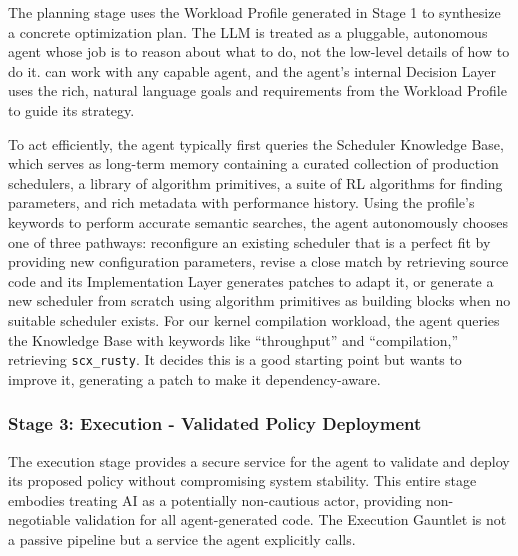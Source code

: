 The planning stage uses the Workload Profile generated in Stage 1 to synthesize a concrete optimization plan. The LLM is treated as a pluggable, autonomous agent whose job is to reason about what to do, not the low-level details of how to do it. \sys can work with any capable agent, and the agent's internal Decision Layer uses the rich, natural language goals and requirements from the Workload Profile to guide its strategy.

To act efficiently, the agent typically first queries the Scheduler Knowledge Base, which serves as long-term memory containing a curated collection of production schedulers, a library of algorithm primitives, a suite of RL algorithms for finding parameters, and rich metadata with performance history. Using the profile's keywords to perform accurate semantic searches, the agent autonomously chooses one of three pathways: reconfigure an existing scheduler that is a perfect fit by providing new configuration parameters, revise a close match by retrieving source code and its Implementation Layer generates patches to adapt it, or generate a new scheduler from scratch using algorithm primitives as building blocks when no suitable scheduler exists. For our kernel compilation workload, the agent queries the Knowledge Base with keywords like ``throughput'' and ``compilation,'' retrieving \texttt{scx\_rusty}. It decides this is a good starting point but wants to improve it, generating a patch to make it dependency-aware.

\subsubsection{Stage 3: Execution - Validated Policy Deployment}

The execution stage provides a secure service for the agent to validate and deploy its proposed policy without compromising system stability. This entire stage embodies treating AI as a potentially non-cautious actor, providing non-negotiable validation for all agent-generated code. The Execution Gauntlet is not a passive pipeline but a service the agent explicitly calls.

